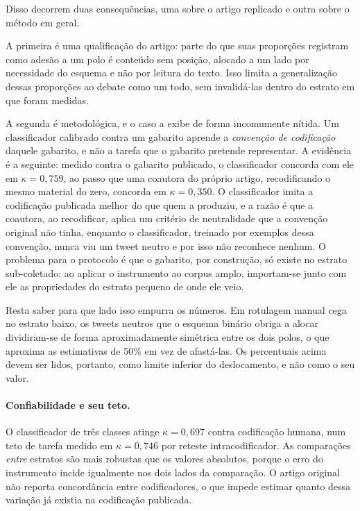 Disso decorrem duas consequências, uma sobre o artigo replicado e outra sobre o
método em geral.

A primeira é uma qualificação do artigo: parte do que suas proporções registram
como adesão a um polo é conteúdo sem posição, alocado a um lado por necessidade do
esquema e não por leitura do texto. Isso limita a generalização dessas proporções
ao debate como um todo, sem invalidá-las dentro do estrato em que foram medidas.

A segunda é metodológica, e o caso a exibe de forma incomumente nítida. Um
classificador calibrado contra um gabarito aprende a \emph{convenção de
codificação} daquele gabarito, e não a tarefa que o gabarito pretende representar.
A evidência é a seguinte: medido contra o gabarito publicado, o classificador
concorda com ele em $\kappa=0{,}759$, ao passo que uma coautora do próprio artigo,
recodificando o mesmo material do zero, concorda em $\kappa=0{,}350$. O
classificador imita a codificação publicada melhor do que quem a produziu, e a
razão é que a coautora, ao recodificar, aplica um critério de neutralidade que a
convenção original não tinha, enquanto o classificador, treinado por exemplos dessa
convenção, nunca viu um tweet neutro e por isso não reconhece nenhum. O problema
para o protocolo é que o gabarito, por construção, só existe no estrato
sub-coletado: ao aplicar o instrumento ao corpus amplo, importam-se junto com ele
as propriedades do estrato pequeno de onde ele veio.

Resta saber para que lado isso empurra os números. Em rotulagem manual cega no
estrato baixo, os tweets neutros que o esquema binário obriga a alocar dividiram-se
de forma aproximadamente simétrica entre os dois polos, o que aproxima as
estimativas de 50\% em vez de afastá-las. Os percentuais acima devem ser lidos,
portanto, como limite inferior do deslocamento, e não como o seu valor.

\paragraph{Confiabilidade e seu teto.} O classificador de três classes atinge
$\kappa=0{,}697$ contra codificação humana, num teto de tarefa medido em
$\kappa=0{,}746$ por reteste intracodificador. As comparações \emph{entre} estratos
são mais robustas que os valores absolutos, porque o erro do instrumento incide
igualmente nos dois lados da comparação. O artigo original não reporta
concordância entre codificadores, o que impede estimar quanto dessa
variação já existia na codificação publicada.

